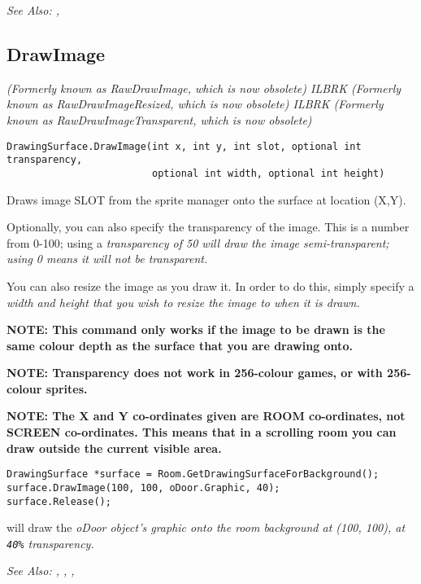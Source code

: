 \it{See Also:} ,


\subsection{DrawImage}\label{DrawingSurface.DrawImage}%

\it{(Formerly known as RawDrawImage, which is now obsolete)} ILBRK
\it{(Formerly known as RawDrawImageResized, which is now obsolete)} ILBRK
\it{(Formerly known as RawDrawImageTransparent, which is now obsolete)}

\begin{verbatim}
DrawingSurface.DrawImage(int x, int y, int slot, optional int transparency,
                         optional int width, optional int height)
\end{verbatim}
Draws image SLOT from the sprite manager onto the surface at location (X,Y).

Optionally, you can also specify the transparency of the image. This is a number
from 0-100; using a \it{transparency} of 50 will draw the image semi-transparent;
using 0 means it will not be transparent.

You can also resize the image as you draw it. In order to do this, simply specify
a \it{width} and \it{height} that you wish to resize the image to when it is drawn.

\bf{NOTE:} This command only works if the image to be drawn is the same colour
depth as the surface that you are drawing onto.

\bf{NOTE:} Transparency does not work in 256-colour games, or with 256-colour sprites.

\bf{NOTE:} The X and Y co-ordinates given are ROOM co-ordinates, not SCREEN co-ordinates.
This means that in a scrolling room you can draw outside the current visible area.

\begin{verbatim}
DrawingSurface *surface = Room.GetDrawingSurfaceForBackground();
surface.DrawImage(100, 100, oDoor.Graphic, 40);
surface.Release();
\end{verbatim}
will draw the \it{oDoor} object's graphic onto the room background at (100, 100), at \verb$40%$
transparency.

\it{See Also:}
,
,
,


